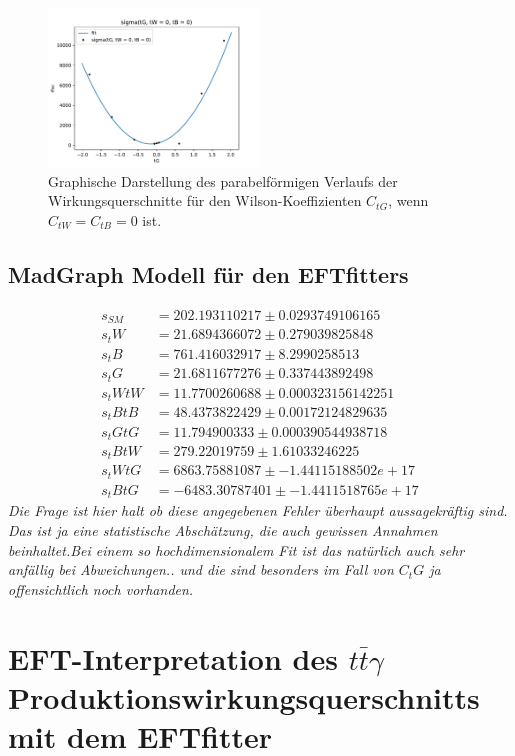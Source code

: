 \begin{figure}
  \centering
  \includegraphics[width=0.5\textwidth]{Plots/combi_plot_tG.pdf}
  \caption{Graphische Darstellung des parabelförmigen Verlaufs der Wirkungsquerschnitte für den Wilson-Koeffizienten $C_{tG}$, wenn $C_{tW}=C_{tB}=0$ ist.}
  \label{fig:WtG}
\end{figure}

\section{MadGraph Modell für den EFTfitters}
\begin{align*}
  s_{SM}   &= 202.193110217 \pm 0.0293749106165\\
  s_tW   &= 21.6894366072 \pm 0.279039825848\\
  s_tB   &= 761.416032917 \pm 8.2990258513\\
  s_tG   &= 21.6811677276 \pm 0.337443892498\\
  s_tWtW &= 11.7700260688 \pm 0.000323156142251\\
  s_tBtB &= 48.4373822429 \pm 0.00172124829635\\
  s_tGtG &= 11.794900333 \pm 0.000390544938718\\
  s_tBtW &= 279.22019759 \pm 1.61033246225\\
  s_tWtG &= 6863.75881087 \pm -1.44115188502e+17\\
  s_tBtG &= -6483.30787401 \pm -1.4411518765e+17
\end{align*}
\textit{Die Frage ist hier halt ob diese angegebenen Fehler überhaupt aussagekräftig sind. Das ist ja eine statistische Abschätzung, die auch gewissen Annahmen beinhaltet.Bei einem so hochdimensionalem Fit ist das natürlich auch sehr anfällig bei Abweichungen.. und die sind besonders im Fall von $C_tG$ ja offensichtlich noch vorhanden.}
%
%
\chapter{EFT-Interpretation des \texorpdfstring {$t\bar{t}\gamma$}{math} Produktionswirkungsquerschnitts mit dem EFTfitter}

